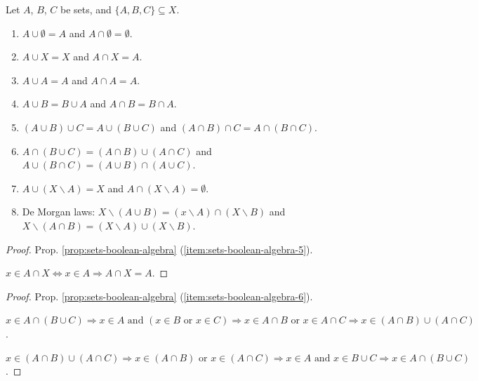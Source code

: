 \documentclass{article}
\begin{document}
\begin{proposition}
    \label{prop:sets-boolean-algebra}
    Let $A$, $B$, $C$ be sets, and $\{A,B,C\} \subseteq X$.
    \begin{enumerate}
        \item \label{item:sets-boolean-algebra-1} $A \cup \emptyset = A$ and $A \cap \emptyset = \emptyset$.
        \item \label{item:sets-boolean-algebra-2} $A \cup X = X$ and $A \cap X = A$.
        \item \label{item:sets-boolean-algebra-3} $A \cup A = A$ and $A \cap A = A$.
        \item \label{item:sets-boolean-algebra-4} $A \cup B = B \cup A$ and $A \cap B = B \cap A$.
        \item \label{item:sets-boolean-algebra-5} $(A \cup B) \cup C = A \cup (B \cup C)$ and $(A \cap B) \cap C = A \cap (B \cap C)$.
        \item \label{item:sets-boolean-algebra-6} $A \cap (B \cup C) = (A \cap B) \cup (A \cap C)$ and $A \cup (B \cap C) = (A \cup B) \cap (A \cup C)$.
        \item \label{item:sets-boolean-algebra-7} $A \cup (X \backslash A) = X$ and $A \cap (X \backslash A) = \emptyset$.
        \item \label{item:sets-boolean-algebra-8} De Morgan laws: $X \backslash (A \cup B) = (x \backslash A) \cap (X \backslash B)$ and $X \backslash (A \cap B) = (X \backslash A) \cup (X \backslash B)$.
    \end{enumerate}
\end{proposition}

\begin{proof}
    Prop. \ref{prop:sets-boolean-algebra} (\ref{item:sets-boolean-algebra-5}).

    $x \in A \cap X \Leftrightarrow x \in A \Rightarrow A \cap X = A$.
\end{proof}

\begin{proof}
    Prop. \ref{prop:sets-boolean-algebra} (\ref{item:sets-boolean-algebra-6}).

    $x \in A \cap (B \cup C) \Rightarrow x \in A \text{ and } (x \in B \text{ or } x \in C) \Rightarrow x \in A \cap B \text{ or } x \in A \cap C \Rightarrow x \in (A \cap B) \cup (A \cap C)$.

    $x \in (A \cap B) \cup (A \cap C) \Rightarrow x \in (A \cap B) \text{ or } x \in (A \cap C) \Rightarrow x \in A \text{ and } x \in B \cup C \Rightarrow x \in A \cap (B \cup C)$.
\end{proof}
\end{document}
